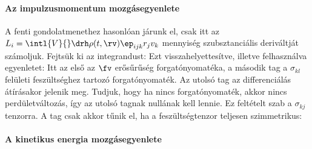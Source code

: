    \paragraph{Az impulzusmomentum mozgásegyenlete}
    
    A fenti gondolatmenethez hasonlóan járunk el, csak itt az $L_i=\intl{V}{}\drh\rho(t,\rv)\ep_{ijk}r_jv_k$ mennyiség szubsztanciális deriváltját számoljuk.
    Fejtsük ki az integrandust:
    Ezt visszahelyettesítve, illetve felhasználva  egyenletet:
    Itt az első az $\fv$ erősűrűség forgatónyomatéka, a második tag a $\sigma_{kl}$ felületi feszültséghez tartozó forgatónyomaték.
   Az utolsó tag az differenciálás átírásakor jelenik meg.
   Tudjuk, hogy ha nincs forgatónyomaték, akkor nincs perdületváltozás, így az utolsó tagnak nullának kell lennie.
   Ez feltételt szab a $\sigma_{kj}$ tenzorra.
   A tag csak akkor tűnik el, ha a feszültségtenzor teljesen szimmetrikus:

   \paragraph{A kinetikus energia mozgásegyenlete}
    
